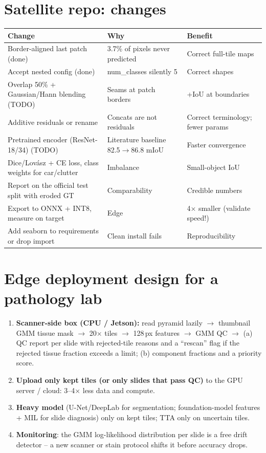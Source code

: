 \section{Satellite repo: changes}
\begin{longtable}{p{5.5cm}p{5.2cm}p{5.3cm}}\toprule
\textbf{Change} & \textbf{Why} & \textbf{Benefit}\\\midrule
Border-aligned last patch (done) & 3.7\% of pixels never predicted & Correct full-tile maps\\
Accept nested config (done) & num\_classes silently 5 & Correct shapes\\
Overlap 50\% + Gaussian/Hann blending (TODO) & Seams at patch borders & +IoU at boundaries\\
Additive residuals or rename & Concats are not residuals & Correct terminology; fewer params\\
Pretrained encoder (ResNet-18/34) (TODO) & Literature baseline 82.5$\to$86.8 mIoU & Faster convergence\\
Dice/Lov\'asz + CE loss, class weights for car/clutter & Imbalance & Small-object IoU\\
Report on the official test split with eroded GT & Comparability & Credible numbers\\
Export to ONNX + INT8, measure on target & Edge & 4$\times$ smaller (validate speed!)\\
Add seaborn to requirements or drop import & Clean install fails & Reproducibility\\
\bottomrule\end{longtable}

\section{Edge deployment design for a pathology lab}
\begin{enumerate}
\item \textbf{Scanner-side box (CPU / Jetson):} read pyramid lazily $\to$ thumbnail GMM tissue mask $\to$ 20$\times$ tiles
$\to$ 128\,px features $\to$ GMM QC $\to$ (a) QC report per slide with rejected-tile reasons and a ``rescan'' flag if the
rejected tissue fraction exceeds a limit; (b) component fractions and a priority score.
\item \textbf{Upload only kept tiles (or only slides that pass QC)} to the GPU server / cloud: 3--4$\times$ less data and compute.
\item \textbf{Heavy model} (U-Net/DeepLab for segmentation; foundation-model features + MIL for slide diagnosis) only on
kept tiles; TTA only on uncertain tiles.
\item \textbf{Monitoring}: the GMM log-likelihood distribution per slide is a free drift detector -- a new scanner or
stain protocol shifts it before accuracy drops.
\end{enumerate}
